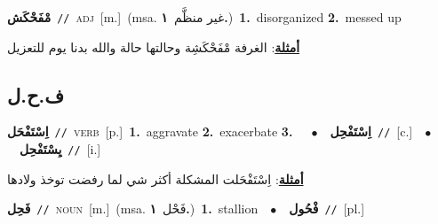 \documentclass[10pt,a4paper,twoside]{article} %
\begin{document}
\begin{multicols}{2}
{\setlength\topsep{0pt}\textbf{\foreignlanguage{arabic}{مْفَحْكَش}}\ {\color{gray}\texttt{//}\color{black}}\ \textsc{adj}\ [m.]\ \color{gray}(msa. \foreignlanguage{arabic}{غير منظَّم}~\foreignlanguage{arabic}{\textbf{١.}})\color{black}\ \textbf{1.}~disorganized  \textbf{2.}~messed up\  \begin{flushright}\color{gray}\foreignlanguage{arabic}{\textbf{\underline{\foreignlanguage{arabic}{أمثلة}}}: الغرفة مْفَحْكَشِة وحالتها حالة والله بدنا يوم للتعزيل}\end{flushright}\color{black}} \vspace{2mm}

\vspace{-3mm}
\subsection*{\color{blue}\foreignlanguage{arabic}{ف.ح.ل}\color{blue}{}} 

{\setlength\topsep{0pt}\textbf{\foreignlanguage{arabic}{اِسْتَفْحَل}}\ {\color{gray}\texttt{//}\color{black}}\ \textsc{verb}\ [p.]\ \textbf{1.}~aggravate  \textbf{2.}~exacerbate  \textbf{3.}~\ \ $\bullet$\ \ \setlength\topsep{0pt}\textbf{\foreignlanguage{arabic}{اِسْتَفْحِل}}\ {\color{gray}\texttt{//}\color{black}}\ [c.]\ \ $\bullet$\ \ \setlength\topsep{0pt}\textbf{\foreignlanguage{arabic}{يِسْتَفْحِل}}\ {\color{gray}\texttt{//}\color{black}}\ [i.]\  \begin{flushright}\color{gray}\foreignlanguage{arabic}{\textbf{\underline{\foreignlanguage{arabic}{أمثلة}}}: اِسْتَفْحَلت المشكلة أكثر شي لما رفضت توخذ ولادها}\end{flushright}\color{black}} \vspace{2mm}

{\setlength\topsep{0pt}\textbf{\foreignlanguage{arabic}{فَحِل}}\ {\color{gray}\texttt{//}\color{black}}\ \textsc{noun}\ [m.]\ \color{gray}(msa. \foreignlanguage{arabic}{فَحْل}~\foreignlanguage{arabic}{\textbf{١.}})\color{black}\ \textbf{1.}~stallion\ \ $\bullet$\ \ \setlength\topsep{0pt}\textbf{\foreignlanguage{arabic}{فْحُول}}\ {\color{gray}\texttt{//}\color{black}}\ [pl.]\ } \vspace{2mm}


\end{multicols}
\end{document}
